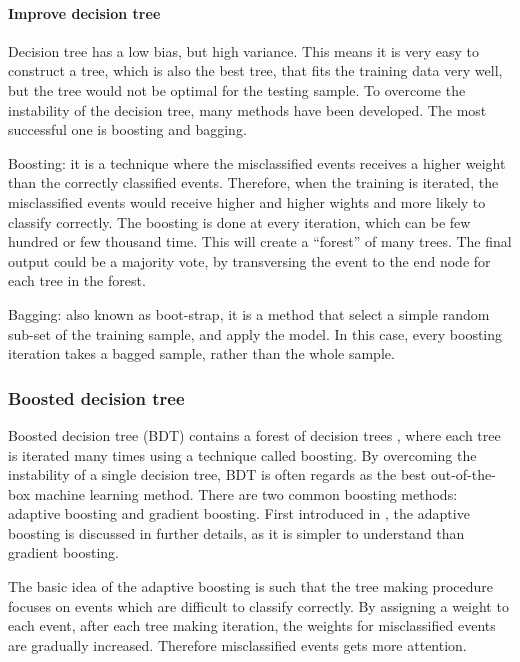 \paragraph{Improve decision tree}

Decision tree has a low bias, but high variance. This means it is very easy to construct a tree, which is also the best tree, that fits the training data very well, but the tree would not be optimal for the testing sample. To overcome the instability of the decision tree, many methods have been developed. The most successful one is boosting and bagging.

Boosting: it is a technique where the misclassified events receives a higher weight than the correctly classified events. Therefore, when the training is iterated, the misclassified events would receive higher and higher wights and more likely to classify correctly. The boosting is done at every iteration, which can be few hundred or few thousand time. This will create a ``forest'' of many trees. The final output could be a majority vote, by transversing the event to the end node for each tree in the forest.

Bagging: also known as boot-strap, it is a method that select a simple random sub-set of the training sample, and apply the model. In this case, every boosting iteration takes a bagged sample, rather than the whole sample.

\subsubsection{Boosted decision tree}
\label{sec:analysisBDT}

Boosted decision tree (BDT) contains a forest of decision trees , where each tree is iterated many times using a technique called boosting.   By overcoming the instability of a single  decision tree, BDT is often regards as  the best out-of-the-box machine learning method. There are two common boosting methods: adaptive boosting and gradient boosting. First introduced in \cite{FREUND1997119}, the adaptive boosting is discussed in further details, as it is simpler to understand than gradient boosting.

The basic idea of the adaptive boosting is such that the tree making procedure focuses on events which are difficult to classify correctly. By assigning a weight to each event,   after each tree making iteration, the weights for misclassified events are gradually increased. Therefore misclassified events gets more attention.

